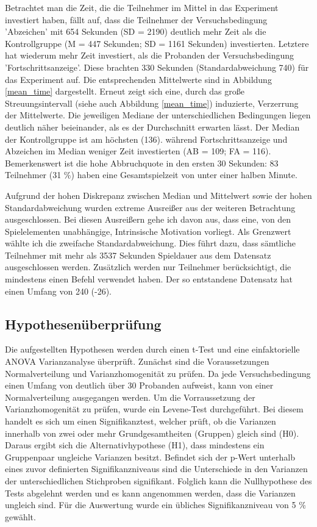 Betrachtet man die Zeit, die die Teilnehmer im Mittel in das Experiment investiert haben, fällt auf, dass die Teilnehmer der Versuchsbedingung 'Abzeichen' mit 654 Sekunden (SD = 2190) deutlich mehr Zeit als die Kontrollgruppe (M = 447 Sekunden; SD = 1161 Sekunden) investierten. Letztere hat wiederum mehr Zeit investiert, als die Probanden der Versuchsbedingung 'Fortschrittsanzeige'. Diese brachten 330 Sekunden (Standardabweichung 740) für das Experiment auf. Die entsprechenden Mittelwerte sind in Abbildung \ref{mean_time} dargestellt. Erneut zeigt sich eine, durch das große Streuungsintervall (siehe auch Abbildung \ref{mean_time}) induzierte, Verzerrung der Mittelwerte. Die jeweiligen Mediane der unterschiedlichen Bedingungen liegen deutlich näher beieinander, als es der Durchschnitt erwarten lässt. Der Median der Kontrollgruppe ist am höchsten (136). während Fortschrittsanzeige und Abzeichen im Median weniger Zeit investierten (AB = 109; FA = 116). Bemerkenswert ist die hohe Abbruchquote in den ersten 30 Sekunden: 83 Teilnehmer (31 \%) haben eine Gesamtspielzeit von unter einer halben Minute.

Aufgrund der hohen Diskrepanz zwischen Median und Mittelwert sowie der hohen Standardabweichung wurden extreme Ausreißer aus der weiteren Betrachtung ausgeschlossen. Bei diesen Ausreißern gehe ich davon aus, dass eine, von den Spielelementen unabhängige, Intrinsische Motivation vorliegt. Als Grenzwert wählte ich die zweifache Standardabweichung. Dies führt dazu, dass sämtliche Teilnehmer mit mehr als 3537 Sekunden Spieldauer aus dem Datensatz ausgeschlossen werden. Zusätzlich werden nur Teilnehmer berücksichtigt, die mindestens einen Befehl verwendet haben. Der so entstandene Datensatz hat einen Umfang von 240 (-26).

\subsection{Hypothesenüberprüfung}\label{hypo}
Die aufgestellten Hypothesen werden durch einen t-Test und eine einfaktorielle  ANOVA  Varianzanalyse überprüft. Zunächst sind die Voraussetzungen Normalverteilung und Varianzhomogenität zu prüfen. Da jede Versuchsbedingung einen Umfang von deutlich über 30 Probanden aufweist, kann von einer Normalverteilung ausgegangen werden. Um die Vorraussetzung der Varianzhomogenität zu prüfen, wurde ein Levene-Test durchgeführt. Bei diesem handelt es sich um einen Signifikanztest, welcher prüft, ob die Varianzen innerhalb von zwei oder mehr Grundgesamtheiten (Gruppen) gleich sind (H0). Daraus ergibt sich die Alternativhypothese (H1), dass mindestens ein Gruppenpaar ungleiche Varianzen besitzt. Befindet sich der p-Wert unterhalb  eines zuvor definierten Signifikanzniveaus sind die Unterschiede in den Varianzen der unterschiedlichen Stichproben signifikant. Folglich kann die Nullhypothese des Tests abgelehnt werden und es kann angenommen werden, dass die Varianzen ungleich sind. Für die Auswertung wurde ein übliches Signifikanzniveau von 5 \% gewählt.


